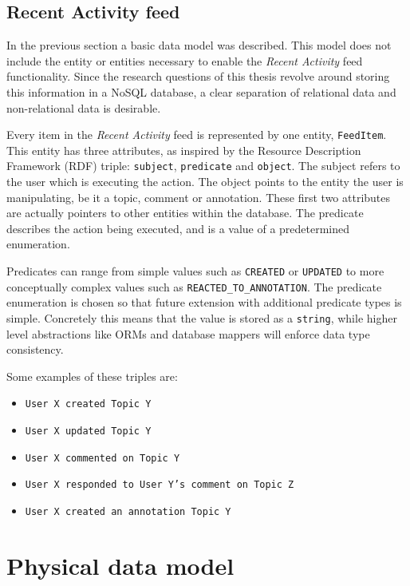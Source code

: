 \subsection{Recent Activity feed}
\label{sec:recent-activity-feed}

In the previous section a basic data model was described.
This model does not include the entity or entities necessary to enable the \textit{Recent Activity} feed functionality.
Since the research questions of this thesis revolve around storing this information in a NoSQL database, a clear separation of relational data and non-relational data is desirable.

Every item in the \textit{Recent Activity} feed is represented by one entity, \texttt{FeedItem}.
This entity has three attributes, as inspired by the Resource Description Framework (RDF) triple: \texttt{subject}, \texttt{predicate} and \texttt{object}.
The subject refers to the user which is executing the action.
The object points to the entity the user is manipulating, be it a topic, comment or annotation.
These first two attributes are actually pointers to other entities within the database.
The predicate describes the action being executed, and is a value of a predetermined enumeration.

Predicates can range from simple values such as \texttt{CREATED} or \texttt{UPDATED} to more conceptually complex values such as \texttt{REACTED\_TO\_ANNOTATION}.
The predicate enumeration is chosen so that future extension with additional predicate types is simple.
Concretely this means that the value is stored as a \texttt{string}, while higher level abstractions like ORMs and database mappers will enforce data type consistency.

Some examples of these triples are:

\begin{itemize}
  \item \texttt{User X created Topic Y}
  \item \texttt{User X updated Topic Y}
  \item \texttt{User X commented on Topic Y}
  \item \texttt{User X responded to User Y's comment on Topic Z}
  \item \texttt{User X created an annotation Topic Y}
\end{itemize}

\section{Physical data model}
\label{sec:physical-data-model}

